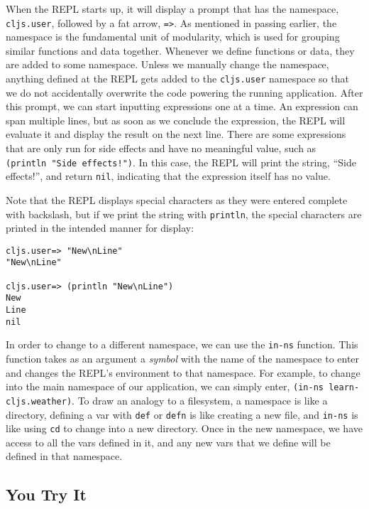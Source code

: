 \documentclass[10pt,twoside,openright]{memoir}
\begin{document}
When the REPL starts up, it will display a prompt that has the
namespace, \texttt{cljs.user}, followed by a fat arrow,
\texttt{=\textgreater{}}. As mentioned in passing earlier, the namespace
is the fundamental unit of modularity, which is used for grouping
similar functions and data together. Whenever we define functions or
data, they are added to some namespace. Unless we manually change the
namespace, anything defined at the REPL gets added to the
\texttt{cljs.user} namespace so that we do not accidentally overwrite
the code powering the running application. After this prompt, we can
start inputting expressions one at a time. An expression can span
multiple lines, but as soon as we conclude the expression, the REPL will
evaluate it and display the result on the next line. There are some
expressions that are only run for side effects and have no meaningful
value, such as \texttt{(println\ "Side\ effects!")}. In this case, the
REPL will print the string, ``Side effects!'', and return \texttt{nil},
indicating that the expression itself has no value.

\begin{notice}[title={Strings in the REPL}]
Note that the REPL displays special characters as they were entered
complete with backslash, but if we print the string with
\texttt{println}, the special characters are printed in the intended
manner for display:

\begin{verbatim}
cljs.user=> "New\nLine"
"New\nLine"

cljs.user=> (println "New\nLine")
New
Line
nil
\end{verbatim}
\end{notice}

In order to change to a different namespace, we can use the
\texttt{in-ns} function. This function takes as an argument a
\emph{symbol} with the name of the namespace to enter and changes the
REPL's environment to that namespace. For example, to change into the
main namespace of our application, we can simply enter,
\texttt{(in-ns\ \textquotesingle{}learn-cljs.weather)}. To draw an
analogy to a filesystem, a namespace is like a directory, defining a var
with \texttt{def} or \texttt{defn} is like creating a new file, and
\texttt{in-ns} is like using \texttt{cd} to change into a new directory.
Once in the new namespace, we have access to all the vars defined in it,
and any new vars that we define will be defined in that namespace.


\subsection{You Try It}
\end{document}
